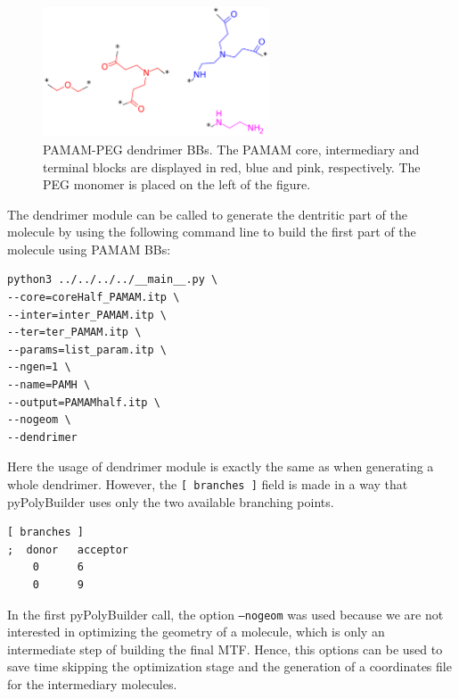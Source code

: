 \begin{figure}
    \centering
    \includegraphics[width=0.6\textwidth]{PAMAM_PEG/PAMAMPEGBBs.png}
    \caption{PAMAM-PEG dendrimer BBs. The PAMAM core, intermediary and terminal blocks are displayed in red, blue and pink, respectively. The PEG monomer is placed on the left of the figure.}
    \label{fig:PAMAMPEGBBs}
\end{figure}

The dendrimer module can be called to generate the dentritic part of the molecule by using the following command line to build the first part of the molecule using PAMAM BBs:

\begin{lstlisting}
python3 ../../../../__main__.py \
--core=coreHalf_PAMAM.itp \
--inter=inter_PAMAM.itp \
--ter=ter_PAMAM.itp \
--params=list_param.itp \
--ngen=1 \
--name=PAMH \
--output=PAMAMhalf.itp \
--nogeom \
--dendrimer
\end{lstlisting}

Here the usage of dendrimer module is exactly the same as when generating a whole dendrimer.
However, the \texttt{[ branches ]} field is made in a way that pyPolyBuilder uses only the two available branching points.

\begin{lstlisting}
[ branches ]
;  donor   acceptor
    0      6
    0      9
\end{lstlisting}

In the first pyPolyBuilder call, the option \texttt{--nogeom} was used because we are not interested in optimizing the geometry of a molecule, which is only an intermediate step of building the final MTF.
Hence, this options can be used to save time skipping the optimization stage and the generation of a coordinates file for the intermediary molecules.

